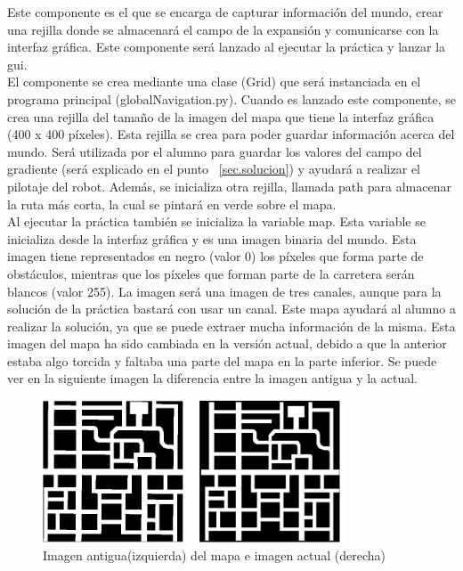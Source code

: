 Este componente es el que se encarga de capturar información del mundo, crear una rejilla donde se almacenará el campo de la expansión y comunicarse con la interfaz gráfica. Este componente será lanzado al ejecutar la práctica y lanzar la \acrshort{gui}.\\

El componente se crea mediante una clase (Grid) que será instanciada en el programa principal (globalNavigation.py). Cuando es lanzado este componente, se crea una rejilla del tamaño de la imagen del mapa que tiene la interfaz gráfica (400 x 400 píxeles). Esta rejilla se crea para poder guardar información acerca del mundo. Será utilizada por el alumno para guardar los valores del campo del gradiente (será explicado en el punto ~\ref{sec.solucion}) y ayudará a realizar el pilotaje del robot. Además, se inicializa otra rejilla, llamada path para almacenar la ruta más corta, la cual se pintará en verde sobre el mapa.\\

Al ejecutar la práctica también se inicializa la variable map. Esta variable se inicializa desde la interfaz gráfica y es una imagen binaria del mundo. Esta imagen tiene representados en negro (valor 0) los píxeles que forma parte de obstáculos, mientras que los píxeles que forman parte de la carretera serán blancos (valor 255). La imagen será una imagen de tres canales, aunque para la solución de la práctica bastará con usar un canal. Este mapa ayudará al alumno a realizar la solución, ya que se puede extraer mucha información de la misma. Esta imagen del mapa ha sido cambiada en la versión actual, debido a que la anterior estaba algo torcida y faltaba una parte del mapa en la parte inferior. Se puede ver en la siguiente imagen la diferencia entre la imagen antigua y la actual.

\begin{figure}[H]
  \begin{center}
    \includegraphics[width=0.8\textwidth]{figures/GPP/imagenes_Mapa.png}
		\caption{Imagen antigua(izquierda) del mapa e imagen actual (derecha)}
		\label{fig.imag_mapa}
		\end{center}
\end{figure}

